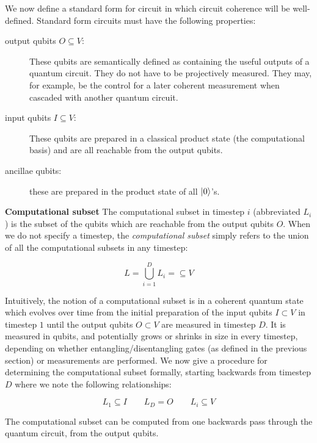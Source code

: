 We now define a standard form for circuit in which circuit coherence will be
well-defined. Standard form circuits must have the following properties:

\begin{description}
\item[output qubits $O \subseteq V$:] These qubits are semantically defined as
containing the useful outputs of a quantum circuit. They do not have to be
projectively measured. They may, for example, be the control for a
later coherent measurement when cascaded with another quantum circuit.
\item[input qubits $I \subseteq V$:] These qubits are prepared in a 
classical product state (the computational basis)
and are all reachable from the
output qubits.
\item[ancillae qubits:] these are prepared in the product state of all $\left\vert{0}\right\rangle$'s.
\end{description}

\begin{definition}{\textbf{Computational subset}}
The computational subset in timestep $i$ (abbreviated $L_i$) is the subset of the qubits
which are reachable from the output qubits $O$.
When we do not specify a timestep, the \emph{computational subset} simply
refers to the union of all the computational subsets in any timestep:

\begin{equation}
L = \bigcup_{i=1}^D L_i = \subseteq V
\end{equation}
\end{definition}

Intuitively, the notion of a computational subset is
in a coherent quantum state which evolves over time from
the initial preparation of the input qubits $I \subset V$ in timestep $1$
until the output qubits $O \subset V$ are
measured in timestep $D$.
It is measured in qubits, and potentially grows or shrinks in size
in every timestep, depending on whether entangling/disentangling gates
(as defined in the previous section) or measurements
are performed. We now give a procedure for determining the computational subset formally,
starting backwards from timestep $D$ where we
note the following relationships:

\begin{equation}
L_1 \subseteq I \qquad L_D = O \qquad L_i \subseteq V
\end{equation}

The computational subset can be computed from one backwards pass through
the quantum circuit, from the output qubits.

